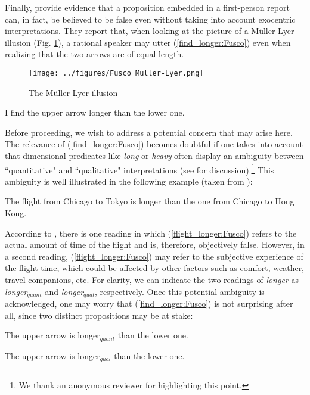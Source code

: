 \documentclass[output=paper,colorlinks,citecolor=brown]{langscibook}
\begin{document}
Finally, \citet{crespo2019tasting} provide evidence that a proposition embedded in a first-person report can, in fact, be believed to be false even without taking into account exocentric interpretations. They report that, when looking at the picture of a Müller-Lyer illusion (Fig. \ref{fig:muller-lyer:Fusco}), a rational speaker may utter (\ref{find_longer:Fusco}) even when realizing that the two arrows are of equal length.

\begin{figure}
\texttt{[image: ../figures/Fusco\_Muller-Lyer.png]}
\caption{The Müller-Lyer illusion}
\label{fig:muller-lyer:Fusco}
\end{figure}

\ea \label{find_longer:Fusco} {I find the upper arrow longer than the lower one.} 
\z

Before proceeding, we wish to address a potential concern that may arise here. The relevance of (\ref{find_longer:Fusco}) becomes doubtful if one takes into account that dimensional predicates like \textit{long} or \textit{heavy} often display an ambiguity between ``quantitative" and ``qualitative" interpretations (see \cite{kennedy_2013} for discussion).\footnote{We thank an anonymous reviewer for highlighting this point.} This ambiguity is well illustrated in the following example (taken from \cite{kennedy_2013}):

\ea \label{flight_longer:Fusco} {The flight from Chicago to Tokyo is longer than the one from Chicago to Hong Kong.}
\z

According to \citet{kennedy_2013}, there is one reading in which (\ref{flight_longer:Fusco}) refers to the actual amount of time of the flight and is, therefore, objectively false. However, in a second reading, (\ref{flight_longer:Fusco}) may refer to the subjective experience of the flight time, which could be affected by other factors such as comfort, weather, travel companions, etc. For clarity, we can indicate the two readings of \textit{longer} as \textit{longer}$_{\textit{quant}}$ and \textit{longer}$_{\textit{qual}}$, respectively. Once this potential ambiguity is acknowledged, one may worry that (\ref{find_longer:Fusco}) is not surprising after all, since two distinct propositions may be at stake:

\ea \label{longer_quant:Fusco} {The upper arrow is longer$_{\textit{quant}}$ than the lower one.}

\ex \label{longer_qual:Fusco} {The upper arrow is longer$_{\textit{qual}}$ than the lower one.}
\z
\end{document}
